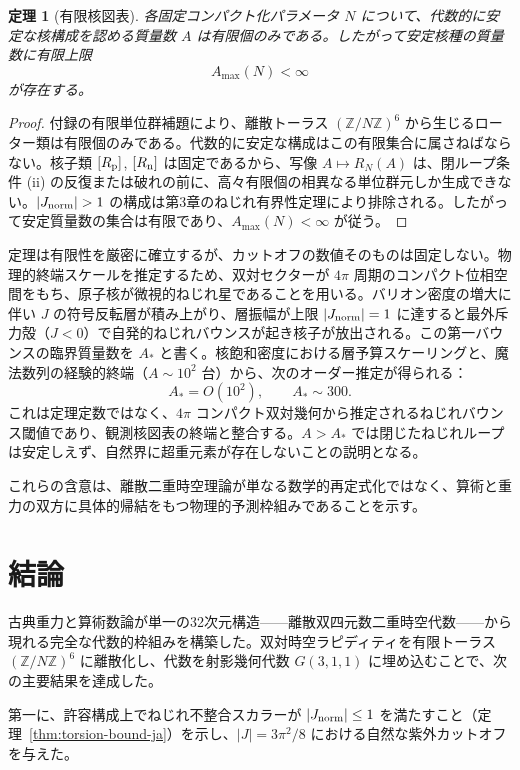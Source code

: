 \documentclass[dvipdfmx,a4paper]{article}
\newtheorem{theorem}{定理}[section]
\theoremstyle{definition}
\theoremstyle{remark}
\newcommand{\Jnorm}{J_{\rm norm}}
\begin{document}
\begin{theorem}[有限核図表]
各固定コンパクト化パラメータ $N$ について、代数的に安定な核構成を認める質量数 $A$ は有限個のみである。したがって安定核種の質量数に有限上限
\[
A_{\max}(N) < \infty
\]
が存在する。
\end{theorem}

\begin{proof}
付録の有限単位群補題により、離散トーラス $(\mathbb{Z}/N\mathbb{Z})^6$ から生じるローター類は有限個のみである。代数的に安定な構成はこの有限集合に属さねばならない。核子類 $[R_{\rm p}]$, $[R_{\rm n}]$ は固定であるから、写像 $A \mapsto R_N(A)$ は、閉ループ条件 (ii) の反復または破れの前に、高々有限個の相異なる単位群元しか生成できない。$|\Jnorm| > 1$ の構成は第3章のねじれ有界性定理により排除される。したがって安定質量数の集合は有限であり、$A_{\max}(N) < \infty$ が従う。
\end{proof}

定理は有限性を厳密に確立するが、カットオフの数値そのものは固定しない。物理的終端スケールを推定するため、双対セクターが $4\pi$ 周期のコンパクト位相空間をもち、原子核が微視的ねじれ星であることを用いる。バリオン密度の増大に伴い $J$ の符号反転層が積み上がり、層振幅が上限 $|\Jnorm| = 1$ に達すると最外斥力殻（$J < 0$）で自発的ねじれバウンスが起き核子が放出される。この第一バウンスの臨界質量数を $A_*$ と書く。核飽和密度における層予算スケーリングと、魔法数列の経験的終端（$A \sim 10^2$ 台）から、次のオーダー推定が得られる：
\[
A_* = O(10^2), \qquad A_* \sim 300.
\]
これは定理定数ではなく、$4\pi$ コンパクト双対幾何から推定されるねじれバウンス閾値であり、観測核図表の終端と整合する。$A > A_*$ では閉じたねじれループは安定しえず、自然界に超重元素が存在しないことの説明となる。

これらの含意は、離散二重時空理論が単なる数学的再定式化ではなく、算術と重力の双方に具体的帰結をもつ物理的予測枠組みであることを示す。

\section{結論}

古典重力と算術数論が単一の32次元構造——離散双四元数二重時空代数——から現れる完全な代数的枠組みを構築した。双対時空ラピディティを有限トーラス $(\mathbb{Z}/N\mathbb{Z})^6$ に離散化し、代数を射影幾何代数 $G(3,1,1)$ に埋め込むことで、次の主要結果を達成した。

第一に、許容構成上でねじれ不整合スカラーが $|\Jnorm| \leq 1$ を満たすこと（定理~\ref{thm:torsion-bound-ja}）を示し、$|J| = 3\pi^2/8$ における自然な紫外カットオフを与えた。
\end{document}
